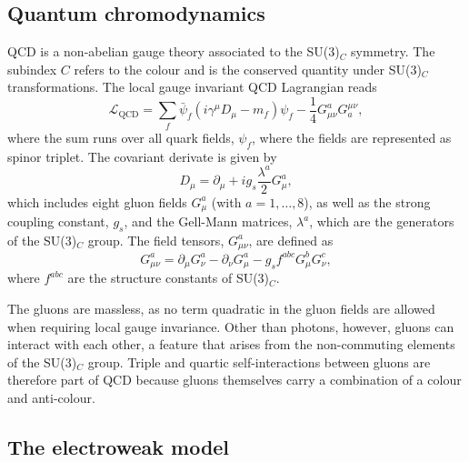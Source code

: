 \subsection{Quantum chromodynamics}
\label{subsec:qcd}
QCD is a non-abelian gauge theory associated to the SU(3)$_C$ symmetry. The subindex $C$ refers to the colour and is the conserved quantity under SU(3)$_C$ transformations.
The local gauge invariant QCD Lagrangian reads
\begin{equation}
  \mathcal{L}_{\text{QCD}} = \sum_f \bar{\psi}_f(i\gamma^\mu D_\mu - m_f)\psi_f - \frac{1}{4}G_{\mu\nu}^aG^{\mu\nu}_{a},  \label{eq:lqcd}
\end{equation}
where the sum runs over all quark fields, $\psi_f$, where the fields are represented as spinor triplet. 
The covariant derivate is given by
\begin{equation}
    D_\mu = \partial_\mu + i g_s \frac{\lambda^a}{2} G_\mu^a,
\end{equation}
which includes eight gluon fields $G_\mu^a$ (with $a = 1, \ldots, 8$), as well as the strong coupling constant, $g_s$, and the Gell-Mann matrices, $\lambda^a$, which are the generators of the SU(3)$_C$ group.
The field tensors, $G_{\mu\nu}^a$, are defined as
\begin{equation}
  \label{eq:qcd-tensor}
  G_{\mu\nu}^a = \partial_\mu G_\nu^a - \partial_\nu G_\mu^a - g_s f^{abc}G_\mu^b G_\nu^c,
\end{equation}
where $f^{abc}$ are the structure constants of SU(3)$_C$. 

The gluons are massless, as no term quadratic in the gluon fields are allowed when requiring local gauge invariance. Other than photons, however, gluons can interact with each other, a feature that arises from the non-commuting elements of the SU(3)$_C$ group. Triple and quartic self-interactions between gluons are therefore part of QCD because gluons themselves carry a combination of a colour and anti-colour. 



\subsection{The electroweak model}
\label{subsec:ew-model}


